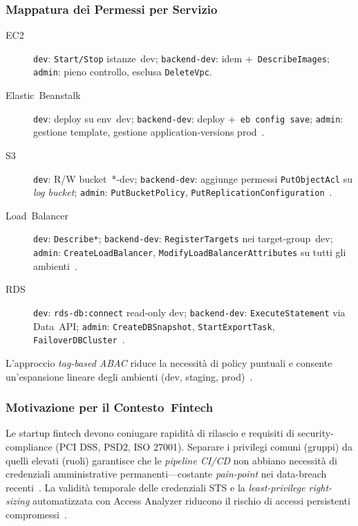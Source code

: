 \subsubsection{Mappatura dei Permessi per Servizio}
\label{subsubsec:mappa_servizi}

\begin{description}
  \item[EC2] \texttt{dev}: \texttt{Start/Stop} istanze dev; \texttt{backend‑dev}: idem + \texttt{DescribeImages}; \texttt{admin}: pieno controllo, esclusa
        \texttt{DeleteVpc}.  
  \item[Elastic Beanstalk] \texttt{dev}: deploy su env dev; \texttt{backend‑dev}: deploy + \texttt{eb config save}; \texttt{admin}: gestione template, gestione
        application‑versions prod \cite{AWSEBRole}.  
  \item[S3] \texttt{dev}: R/W bucket *-dev; \texttt{backend‑dev}: aggiunge permessi
        \texttt{PutObjectAcl} su \emph{log bucket}; \texttt{admin}:
        \texttt{PutBucketPolicy}, \texttt{PutReplicationConfiguration} \cite{AWSS3Security}.  
  \item[Load Balancer] \texttt{dev}: \texttt{Describe*}; \texttt{backend‑dev}: \texttt{RegisterTargets} nei target‑group dev; \texttt{admin}: \texttt{CreateLoadBalancer}, \texttt{ModifyLoadBalancerAttributes} su tutti gli ambienti \cite{AWSELBIAM}.  
  \item[RDS] \texttt{dev}: \texttt{rds-db:connect} read‑only dev; \texttt{backend‑dev}:
        \texttt{ExecuteStatement} via Data API; \texttt{admin}:
        \texttt{CreateDBSnapshot}, \texttt{StartExportTask}, \texttt{FailoverDBCluster} \cite{AWSRDSIAM}.  
\end{description}

L'approccio \emph{tag‑based ABAC} riduce la necessità di policy
puntuali e consente un'espansione lineare degli ambienti (dev, staging,
prod) \cite{AWSEC2IAM,AWSELBIAM}.

\subsubsection{Motivazione per il Contesto Fintech}
\label{subsubsec:motivazione_fintech}
Le startup fintech devono coniugare rapidità di rilascio e requisiti di
security-compliance (PCI DSS, PSD2, ISO 27001).  
Separare i privilegi comuni (gruppi) da quelli elevati (ruoli)
garantisce che le \emph{pipeline CI/CD} non abbiano necessità di
credenziali amministrative permanenti—costante
\emph{pain-point} nei data-breach recenti \cite{MediumIAMGuide}.  
La validità temporale delle credenziali STS e la \emph{least-privilege
right-sizing} automatizzata con Access Analyzer riducono il rischio di
accessi persistenti compromessi \cite{DatadogLeastPrivilege,AWSIAMBestPractices}.

